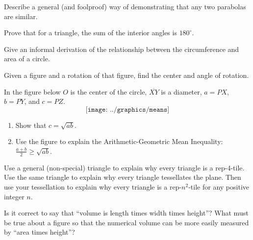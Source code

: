 \begin{prob}
Describe a general (and foolproof) way of demonstrating that any two parabolas are similar.
\end{prob}

\begin{prob}
Prove that for a triangle, the sum of the interior angles is $180^\circ$.
\end{prob}

%
%
\begin{prob}
Give an informal derivation of the relationship between the circumference and area of a circle. 
\end{prob}

\begin{prob}
Given a figure and a rotation of that figure, find the center and angle of rotation.  
\end{prob}

\begin{prob}
In the figure below  $O$ is the center of the circle, $\overline{XY}$ is a diameter, $a = PX$, $b=PY$, and $c=PZ$.  
$$\texttt{[image: ../graphics/means]}$$
\begin{enumerate}
\item Show that $c=\sqrt{ab}$.  
\item Use the figure to explain the Arithmetic-Geometric Mean Inequality: $\frac{a+b}{2} \ge \sqrt{ab}$.  
\end{enumerate}
\end{prob}

\begin{prob}
Use a general (non-special) triangle to explain why every triangle is a rep-4-tile.  
Use the same triangle to explain why every triangle tessellates the plane.  Then use your tessellation to explain why every triangle is a rep-$n^2$-tile for any positive integer $n$. 
\end{prob}


\begin{prob}
 Is it correct to say that ``volume is length times width times height''? What must be true about a figure so that the numerical volume can be more easily measured by ``area times height''?
\end{prob}

